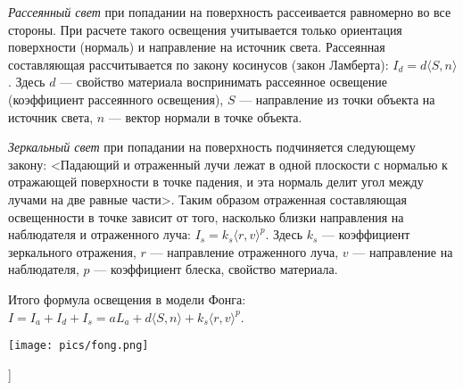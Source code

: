 \textit{Рассеянный свет} при попадании на поверхность рассеивается равномерно во все стороны. 
При расчете такого освещения учитывается только ориентация поверхности (нормаль) и направление на источник света. 
Рассеянная составляющая рассчитывается по закону косинусов (закон Ламберта): $I_d = d \langle S, n \rangle$. 
Здесь $d$ --- свойство материала воспринимать рассеянное освещение (коэффициент рассеянного освещения), $S$ --- направление из точки объекта на источник света, $n$ --- вектор нормали в точке объекта.

\textit{Зеркальный свет} при попадании на поверхность подчиняется следующему закону: <Падающий и отраженный лучи лежат в одной плоскости с нормалью к отражающей поверхности в точке падения, и эта нормаль делит угол между лучами на две равные части>. 
Таким образом отраженная составляющая освещенности в точке зависит от того, насколько близки направления на наблюдателя и отраженного луча: $I_s = k_s \langle r, v \rangle^p$. Здесь $k_s$ --- коэффициент зеркального отражения, $r$ --- направление отраженного луча, $v$ --- направление на наблюдателя, $p$ --- коэффициент блеска, свойство материала.

Итого формула освещения в модели Фонга: $I = I_a + I_d + I_s = a L_a + d \langle S, n \rangle + k_s \langle r, v \rangle^p$.

\texttt{[image: pics/fong.png]}

\bigbreak
[\cite[page 19-26]{iit_graphics}]